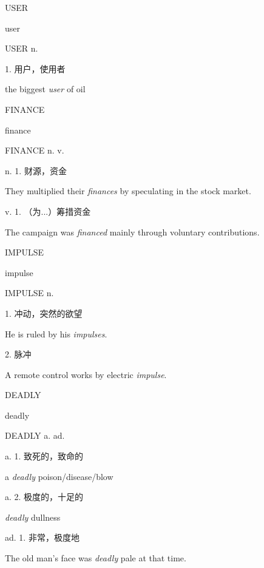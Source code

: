 \begin{flashcard}{
USER

user
}
\begin{center}
USER n. 
\end{center}
1. 用户，使用者

the biggest \textit{user} of oil

\end{flashcard}
\begin{flashcard}{
FINANCE

finance
}
\begin{center}
FINANCE n. v. 
\end{center}
n. 1. 财源，资金

They multiplied their \textit{finances} by speculating in the stock market.

v. 1. （为...）筹措资金

The campaign was \textit{financed} mainly through voluntary contributions.

\end{flashcard}
\begin{flashcard}{
IMPULSE

impulse
}
\begin{center}
IMPULSE n. 
\end{center}
1. 冲动，突然的欲望

He is ruled by his \textit{impulses}.

2. 脉冲

A remote control works by electric \textit{impulse}.

\end{flashcard}
\begin{flashcard}{
DEADLY

deadly
}
\begin{center}
DEADLY a. ad. 
\end{center}
a. 1. 致死的，致命的

a \textit{deadly} poison/disease/blow

a. 2. 极度的，十足的

\textit{deadly} dullness

ad. 1. 非常，极度地

The old man's face was \textit{deadly} pale at that time.

\end{flashcard}
